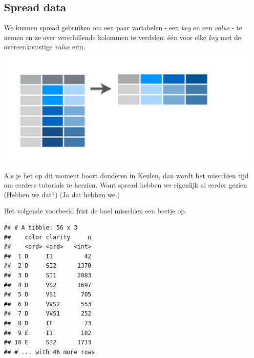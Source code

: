 \documentclass[]{tufte-book}
\newenvironment{Shaded}{}{}
\newcommand{\KeywordTok}[1]{\textcolor[rgb]{0.00,0.44,0.13}{\textbf{#1}}}
\newcommand{\NormalTok}[1]{#1}
\newcommand{\OperatorTok}[1]{\textcolor[rgb]{0.40,0.40,0.40}{#1}}
\newcommand{\StringTok}[1]{\textcolor[rgb]{0.25,0.44,0.63}{#1}}
\begin{document}
\hypertarget{spread-data}{%
\subsection{Spread data}\label{spread-data}}

We kunnen spread gebruiken om een paar variabelen - een \emph{key} en een \emph{value} - te nemen en ze over verschillende kolommen te verdelen: één voor elke \emph{key} met de overeenkomstige \emph{value} erin.

\includegraphics[width=1\linewidth]{images/spread}

Als je het op dit moment hoort donderen in Keulen, dan wordt het misschien tijd om eerdere tutorials te herzien. Want spread hebben we eigenlijk al eerder gezien (Hebben we dat?) (Ja dat hebben we.)

Het volgende voorbeeld frist de boel misschien een beetje op.

\begin{Shaded}
\end{Shaded}

\begin{verbatim}
## # A tibble: 56 x 3
##    color clarity     n
##    <ord> <ord>   <int>
##  1 D     I1         42
##  2 D     SI2      1370
##  3 D     SI1      2083
##  4 D     VS2      1697
##  5 D     VS1       705
##  6 D     VVS2      553
##  7 D     VVS1      252
##  8 D     IF         73
##  9 E     I1        102
## 10 E     SI2      1713
## # ... with 46 more rows
\end{verbatim}

\begin{Shaded}
\end{Shaded}
\end{document}

